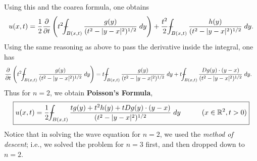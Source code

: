 \documentclass{article}
\def\Xint#1{\mathchoice
	{\XXint\displaystyle\textstyle{#1}}%
	{\XXint\textstyle\scriptstyle{#1}}%
	{\XXint\scriptstyle\scriptscriptstyle{#1}}%
	{\XXint\scriptscriptstyle\scriptscriptstyle{#1}}%
	\!\int}
\def\XXint#1#2#3{{\setbox0=\hbox{$#1{#2#3}{\int}$ }
		\vcenter{\hbox{$#2#3$ }}\kern-0.6\wd0}}
\def\dashint{\Xint-}
\numberwithin{equation}{section}
\begin{document}
	Using this and the coarea formula, one obtains 
	\begin{equation*}
		u(x, t) = \frac{1}{2}\frac{\partial}{\partial t}\left(t^{2}\dashint_{B(x,t)}\frac{g(y)}{(t^{2} - |y - x|^{2})^{1/2}}\;dy\right) + \frac{t^{2}}{2}\dashint_{B(x,t)}\frac{h(y)}{(t^{2} - |y - x|^{2})^{1/2}}\;dy.
	\end{equation*}
	Using the same reasoning as above to pass the derivative inside the integral, one has 
	\begin{align*}
		\begin{split}
			\frac{\partial}{\partial t}\left(t^{2}\dashint_{B(x,t)}\frac{g(y)}{(t^{2} - |y - x|^{2})^{1/2}}\;dy\right) &= t\dashint_{B(x,t)}\frac{g(y)}{(t^{2} - |y - x|^{2})^{1/2}}\;dy + t\dashint_{B(x,t)}\frac{Dg(y) \cdot (y -x)}{(t^{2} - |y - x|^{2})^{1/2}}\;dy. 
		\end{split}
	\end{align*}
	Thus for $n = 2$, we obtain \textbf{Poisson's Formula}, 
	\begin{equation}
		\boxed{
			u(x,t) = \frac{1}{2}\dashint_{B(x,t)}\frac{ tg(y) + t^{2}h(y) + tDg(y) \cdot (y -x) }{(t^{2} - |y - x|^{2})^{1/2}}\;dy \qquad \quad (x \in \mathbb{R}^{2}, t > 0)
		}
	\end{equation}
	Notice that in solving the wave equation for $n = 2$, we used the \textit{method of descent}; i.e., we solved the problem for $n = 3$ first, and then dropped down to $n =2$. 
	
\end{document}
